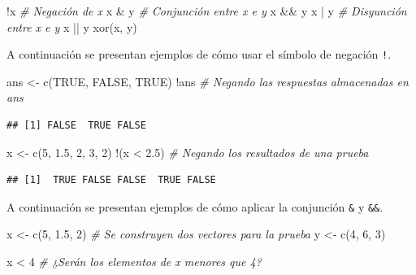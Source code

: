 \documentclass[
]{book}
\makeatletter
\newenvironment{Shaded}{\begin{snugshade}}{\end{snugshade}}
\newcommand{\CommentTok}[1]{\textcolor[rgb]{0.56,0.35,0.01}{\textit{#1}}}
\newcommand{\ConstantTok}[1]{\textcolor[rgb]{0.00,0.00,0.00}{#1}}
\newcommand{\DecValTok}[1]{\textcolor[rgb]{0.00,0.00,0.81}{#1}}
\newcommand{\FloatTok}[1]{\textcolor[rgb]{0.00,0.00,0.81}{#1}}
\newcommand{\FunctionTok}[1]{\textcolor[rgb]{0.00,0.00,0.00}{#1}}
\newcommand{\NormalTok}[1]{#1}
\newcommand{\OtherTok}[1]{\textcolor[rgb]{0.56,0.35,0.01}{#1}}
\newcommand{\SpecialCharTok}[1]{\textcolor[rgb]{0.00,0.00,0.00}{#1}}
\newenvironment{kframe}{%
\medskip{}
\setlength{\fboxsep}{.8em}
 \def\at@end@of@kframe{}%
 \ifinner\ifhmode%
  \def\at@end@of@kframe{\end{minipage}}%
  \begin{minipage}{\columnwidth}%
 \fi\fi%
 \def\FrameCommand##1{\hskip\@totalleftmargin \hskip-\fboxsep
 \colorbox{shadecolor}{##1}\hskip-\fboxsep
     \hskip-\linewidth \hskip-\@totalleftmargin \hskip\columnwidth}%
 \MakeFramed {\advance\hsize-\width
   \@totalleftmargin\z@ \linewidth\hsize
   \@setminipage}}%
 {\par\unskip\endMakeFramed%
 \at@end@of@kframe}
\renewenvironment{Shaded}{\begin{kframe}}{\end{kframe}}
\makeatother
\begin{document}
\begin{Shaded}
\begin{Highlighting}[]
\SpecialCharTok{!}\NormalTok{x  }\CommentTok{\# Negación de x}
\NormalTok{x }\SpecialCharTok{\&}\NormalTok{ y  }\CommentTok{\# Conjunción entre x e y}
\NormalTok{x }\SpecialCharTok{\&\&}\NormalTok{ y}
\NormalTok{x }\SpecialCharTok{|}\NormalTok{ y  }\CommentTok{\# Disyunción entre x e y}
\NormalTok{x }\SpecialCharTok{||}\NormalTok{ y}
\FunctionTok{xor}\NormalTok{(x, y)}
\end{Highlighting}
\end{Shaded}

A continuación se presentan ejemplos de cómo usar el símbolo de negación \texttt{!}.

\begin{Shaded}
\begin{Highlighting}[]
\NormalTok{ans }\OtherTok{\textless{}{-}} \FunctionTok{c}\NormalTok{(}\ConstantTok{TRUE}\NormalTok{, }\ConstantTok{FALSE}\NormalTok{, }\ConstantTok{TRUE}\NormalTok{)}
\SpecialCharTok{!}\NormalTok{ans  }\CommentTok{\# Negando las respuestas almacenadas en ans}
\end{Highlighting}
\end{Shaded}

\begin{verbatim}
## [1] FALSE  TRUE FALSE
\end{verbatim}

\begin{Shaded}
\begin{Highlighting}[]
\NormalTok{x }\OtherTok{\textless{}{-}} \FunctionTok{c}\NormalTok{(}\DecValTok{5}\NormalTok{, }\FloatTok{1.5}\NormalTok{, }\DecValTok{2}\NormalTok{, }\DecValTok{3}\NormalTok{, }\DecValTok{2}\NormalTok{)}
\SpecialCharTok{!}\NormalTok{(x }\SpecialCharTok{\textless{}} \FloatTok{2.5}\NormalTok{)  }\CommentTok{\# Negando los resultados de una prueba}
\end{Highlighting}
\end{Shaded}

\begin{verbatim}
## [1]  TRUE FALSE FALSE  TRUE FALSE
\end{verbatim}

A continuación se presentan ejemplos de cómo aplicar la conjunción \texttt{\&} y \texttt{\&\&}.

\begin{Shaded}
\begin{Highlighting}[]
\NormalTok{x }\OtherTok{\textless{}{-}} \FunctionTok{c}\NormalTok{(}\DecValTok{5}\NormalTok{, }\FloatTok{1.5}\NormalTok{, }\DecValTok{2}\NormalTok{)  }\CommentTok{\# Se construyen dos vectores para la prueba}
\NormalTok{y }\OtherTok{\textless{}{-}} \FunctionTok{c}\NormalTok{(}\DecValTok{4}\NormalTok{, }\DecValTok{6}\NormalTok{, }\DecValTok{3}\NormalTok{)}

\NormalTok{x }\SpecialCharTok{\textless{}} \DecValTok{4}  \CommentTok{\# ¿Serán los elementos de x menores que 4?}
\end{Highlighting}
\end{Shaded}
\end{document}
